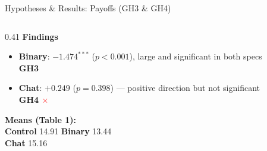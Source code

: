 \documentclass[aspectratio=169,10pt]{beamer}
\newcommand{\cg}[1]{\textcolor{controlgreen}{\textbf{#1}}}
\newcommand{\bo}[1]{\textcolor{binaryorange}{\textbf{#1}}}
\newcommand{\cb}[1]{\textcolor{chatblue}{\textbf{#1}}}
\newcommand{\yes}{\textcolor{controlgreen}{\checkmark}}
\newcommand{\no}{\textcolor{red}{$\times$}}
\begin{document}
\begin{frame}{Hypotheses \& Results: Payoffs (GH3 \& GH4)}
\begin{columns}[T]
\begin{column}{0.41\textwidth}
    \vspace{0.5em}
    \textbf{Findings}
    \begin{itemize}\small
      \item \bo{Binary}: $-1.474^{***}$ ($p{<}0.001$), large and significant in both specs\\
            \textbf{GH3 \yes}
      \item \cb{Chat}: $+0.249$ ($p{=}0.398$) --- positive direction but not significant\\
            \textbf{GH4 \no}
    \end{itemize}

    \vspace{0.4em}
    \small\textbf{Means (Table 1):}\\
    \cg{Control} 14.91 \quad \bo{Binary} 13.44\\
    \cb{Chat} 15.16
  \end{column}
\end{columns}

\end{frame}
\end{document}
